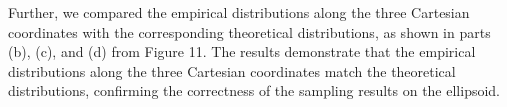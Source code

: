 \documentclass{article}
\begin{document}
        
    

Further, we compared the empirical distributions along the three Cartesian coordinates with the corresponding theoretical distributions, as shown in parts (b), (c), and (d) from Figure 11. The results demonstrate that the empirical distributions along the three Cartesian coordinates match the theoretical distributions, confirming the correctness of the sampling results on the ellipsoid.


\end{document}
